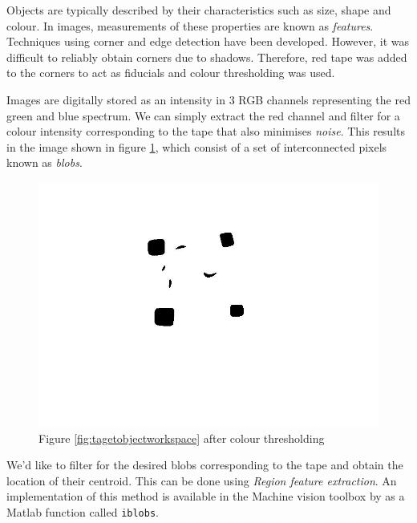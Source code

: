 \documentclass{UoNMCHA}
\numberwithin{equation}{section}
\begin{document}
Objects are typically described by their characteristics such as size, shape and colour.
In images, measurements of these properties are known as \textit{features}. 
Techniques using corner and edge detection have been developed. However, it was difficult to reliably obtain corners due to shadows. Therefore, red tape was added to the corners to act as fiducials and colour thresholding was used. \

Images are digitally stored as an intensity in 3 RGB channels representing the red green and blue spectrum. 
We can simply extract the red channel and filter for a colour intensity corresponding to the tape that also minimises \textit{noise}.
This results in the image shown in figure \ref{fig:tagetobjectworkspacebw}, which consist of a set of interconnected pixels known as \textit{blobs}. 

\begin{figure}[H]
	\begin{center}
		\includegraphics[width=.7\linewidth]{Figures/targetobjectworkspacebw}
		\caption{Figure \ref{fig:tagetobjectworkspace} after colour thresholding}
		\label{fig:tagetobjectworkspacebw}
	\end{center}
\end{figure}


We'd like to filter for the desired blobs corresponding to the tape and obtain the location of their centroid. This can be done using \textit{Region feature extraction}. 
An implementation of this method is available in the Machine vision toolbox by \cite{corke2017robotics} as a Matlab function called \texttt{iblobs}.
\end{document}

